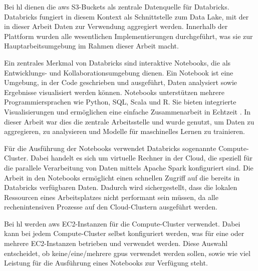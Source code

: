 Bei \gls{hl} dienen die \gls{aws} S3-Buckets als zentrale Datenquelle für Databricks. 
Databricks fungiert in diesem Kontext als Schnittstelle zum Data Lake, mit der in dieser Arbeit Daten zur Verwendung aggregiert werden. Innerhalb der Plattform wurden alle wesentlichen Implementierungen durchgeführt, was sie zur Hauptarbeitsumgebung im Rahmen dieser Arbeit macht.

Ein zentrales Merkmal von Databricks sind interaktive Notebooks, die als Entwicklungs- und Kollaborationsumgebung dienen. Ein Notebook ist eine Umgebung, in der Code geschrieben und ausgeführt, Daten analysiert sowie Ergebnisse visualisiert werden können. Notebooks unterstützen mehrere Programmiersprachen wie Python, SQL, Scala und R. Sie bieten integrierte Visualisierungen und ermöglichen eine einfache Zusammenarbeit in Echtzeit \cite{DatabricksNotebooks}. In dieser Arbeit war dies die zentrale Arbeitsstelle und wurde genutzt, um Daten zu aggregieren, zu analysieren und Modelle für maschinelles Lernen zu trainieren.

Für die Ausführung der Notebooks verwendet Databricks sogenannte Compute-Cluster. Dabei handelt es sich um virtuelle Rechner in der Cloud, die speziell für die parallele Verarbeitung von Daten mittels Apache Spark konfiguriert sind. Die Arbeit in den Notebooks ermöglicht einen schnellen Zugriff auf die bereits in Databricks verfügbaren Daten. Dadurch wird sichergestellt, dass die lokalen Ressourcen eines Arbeitsplatzes nicht performant sein müssen, da alle rechenintensiven Prozesse auf den Cloud-Clustern ausgeführt werden.

Bei \gls{hl} werden \gls{aws} EC2-Instanzen für die Compute-Cluster verwendet. 
Dabei kann bei jedem Compute-Cluster selbst konfiguriert werden, was für eine oder mehrere EC2-Instanzen betrieben und verwendet werden. 
Diese Auswahl entscheidet, ob keine/eine/mehrere \glspl{gpu} verwendet werden sollen, sowie wie viel Leistung für die Ausführung eines Notebooks zur Verfügung steht.
